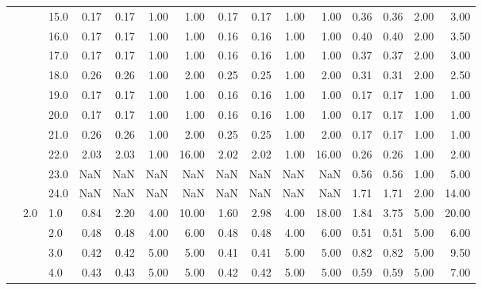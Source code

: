 \begin{tabular}{lllrrrrrrrrrrrr}
       &     & 15.0 &       0.17 &      0.17 & 1.00 &   1.00 &       0.17 &      0.17 &  1.00 &   1.00 &       0.36 &      0.36 &  2.00 &   3.00 \\
       &     & 16.0 &       0.17 &      0.17 & 1.00 &   1.00 &       0.16 &      0.16 &  1.00 &   1.00 &       0.40 &      0.40 &  2.00 &   3.50 \\
       &     & 17.0 &       0.17 &      0.17 & 1.00 &   1.00 &       0.16 &      0.16 &  1.00 &   1.00 &       0.37 &      0.37 &  2.00 &   3.00 \\
       &     & 18.0 &       0.26 &      0.26 & 1.00 &   2.00 &       0.25 &      0.25 &  1.00 &   2.00 &       0.31 &      0.31 &  2.00 &   2.50 \\
       &     & 19.0 &       0.17 &      0.17 & 1.00 &   1.00 &       0.16 &      0.16 &  1.00 &   1.00 &       0.17 &      0.17 &  1.00 &   1.00 \\
       &     & 20.0 &       0.17 &      0.17 & 1.00 &   1.00 &       0.16 &      0.16 &  1.00 &   1.00 &       0.17 &      0.17 &  1.00 &   1.00 \\
       &     & 21.0 &       0.26 &      0.26 & 1.00 &   2.00 &       0.25 &      0.25 &  1.00 &   2.00 &       0.17 &      0.17 &  1.00 &   1.00 \\
       &     & 22.0 &       2.03 &      2.03 & 1.00 &  16.00 &       2.02 &      2.02 &  1.00 &  16.00 &       0.26 &      0.26 &  1.00 &   2.00 \\
       &     & 23.0 &        NaN &       NaN &  NaN &    NaN &        NaN &       NaN &   NaN &    NaN &       0.56 &      0.56 &  1.00 &   5.00 \\
       &     & 24.0 &        NaN &       NaN &  NaN &    NaN &        NaN &       NaN &   NaN &    NaN &       1.71 &      1.71 &  2.00 &  14.00 \\
       & 2.0 & 1.0  &       0.84 &      2.20 & 4.00 &  10.00 &       1.60 &      2.98 &  4.00 &  18.00 &       1.84 &      3.75 &  5.00 &  20.00 \\
       &     & 2.0  &       0.48 &      0.48 & 4.00 &   6.00 &       0.48 &      0.48 &  4.00 &   6.00 &       0.51 &      0.51 &  5.00 &   6.00 \\
       &     & 3.0  &       0.42 &      0.42 & 5.00 &   5.00 &       0.41 &      0.41 &  5.00 &   5.00 &       0.82 &      0.82 &  5.00 &   9.50 \\
       &     & 4.0  &       0.43 &      0.43 & 5.00 &   5.00 &       0.42 &      0.42 &  5.00 &   5.00 &       0.59 &      0.59 &  5.00 &   7.00 \\

\end{tabular}
